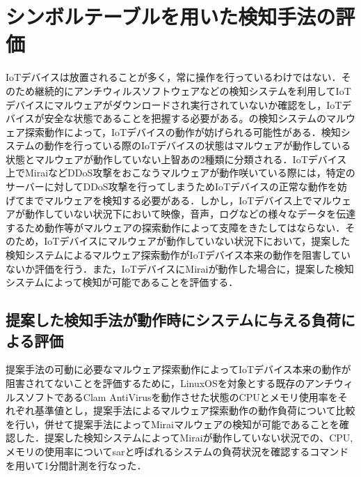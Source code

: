 \newpage
\section{シンボルテーブルを用いた検知手法の評価}

IoTデバイスは放置されることが多く，常に操作を行っているわけではない．そのため継続的にアンチウィルスソフトウェアなどの検知システムを利用してIoTデバイスにマルウェアがダウンロードされ実行されていないか確認をし，IoTデバイスが安全な状態であることを把握する必要がある。の検知システムのマルウェア探索動作によって，IoTデバイスの動作が妨げられる可能性がある．検知システムの動作を行っている際のIoTデバイスの状態はマルウェアが動作している状態とマルウェアが動作していない上智あの2種類に分類される．IoTデバイス上でMiraiなどDDoS攻撃をおこなうマルウェアが動作咲いている際には，特定のサーバーに対してDDoS攻撃を行ってしまうためIoTデバイスの正常な動作を妨げてまでマルウェアを検知する必要がある．しかし，IoTデバイス上でマルウェアが動作していない状況下において映像，音声，ログなどの様々なデータを伝達するため動作等がマルウェアの探索動作によって支障をきたしてはならない．そのため，IoTデバイスにマルウェアが動作していない状況下において，提案した検知システムによるマルウェア探索動作がIoTデバイス本来の動作を阻害していないか評価を行う．また，IoTデバイスにMiraiが動作した場合に，提案した検知システムによって検知が可能であることを評価する．

\subsection{提案した検知手法が動作時にシステムに与える負荷による評価}
提案手法の可動に必要なマルウェア探索動作によってIoTデバイス本来の動作が阻害されてないことを評価するために，LinuxOSを対象とする既存のアンチウィルスソフトであるClam AntiVirusを動作させた状態のCPUとメモリ使用率をそれぞれ基準値とし，提案手法によるマルウェア探索動作の動作負荷について比較を行い，併せて提案手法によってMiraiマルウェアの検知が可能であることを確認した．提案した検知システムによってMiraiが動作していない状況での、CPU,メモリの使用率についてsarと呼ばれるシステムの負荷状況を確認するコマンドを用いて1分間計測を行なった．

